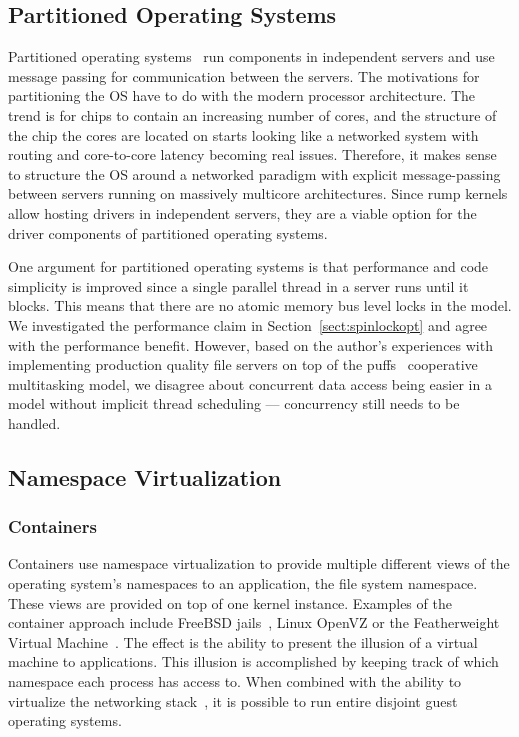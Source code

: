 \subsection{Partitioned Operating Systems}

Partitioned operating systems~\cite{baumann:multikernel,wentzlaff:casefos}
run components in independent servers and use message passing for
communication between the servers.  The motivations for partitioning
the OS have to do with the modern processor architecture.  The trend
is for chips to contain an increasing number of cores, and the structure of the
chip the cores are located on starts looking like a networked system
with routing and core-to-core latency becoming real issues.  Therefore,
it makes sense to structure the OS around a networked paradigm with
explicit message-passing between servers running on massively multicore
architectures.  Since rump kernels allow hosting drivers in independent
servers, they are a viable option for the driver components of partitioned
operating systems.

One argument for partitioned operating systems is that performance
and code simplicity is improved since a single parallel thread in
a server runs until it blocks.  This means that there are no atomic
memory bus level locks in the model.  We investigated the performance
claim in Section~\ref{sect:spinlockopt} and agree with the performance
benefit.  However, based on the author's experiences with implementing
production quality file servers on top of the puffs~\cite{kantee:puffs}
cooperative multitasking model, we disagree about concurrent data
access being easier in a model without implicit thread scheduling ---
concurrency still needs to be handled.

\subsection{Namespace Virtualization}

\subsubsection*{Containers}

Containers use namespace virtualization to provide multiple
different views of the operating system's namespaces to an application, \eg the file
system namespace.  These views are provided on top of one kernel instance.
Examples of the container approach include FreeBSD jails~\cite{phk:jails}, Linux
OpenVZ or the Featherweight Virtual Machine~\cite{yu:fvm}.  The effect is
the ability to present the illusion of a virtual machine to applications.
This illusion is accomplished by keeping track of which namespace each
process has access to.  When combined with the ability to virtualize
the networking stack~\cite{zec:vimage}, it is possible to run entire
disjoint guest operating systems.

